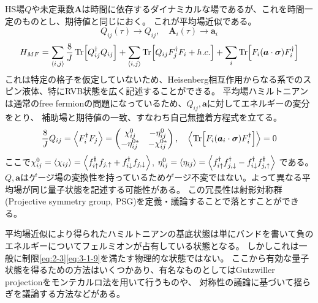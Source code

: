 \documentclass[11pt, aps, longbibliography]{article}
\begin{document}
        HS場$Q$や未定乗数$\boldsymbol{A}$は時間に依存するダイナミカルな場であるが、これを時間一定のものとし、期待値と同じにおく。
        これが平均場近似である。
        \begin{equation}\label{eq:3-1-18}
            Q_{ij}(\tau) \rightarrow Q_{ij}, \quad \boldsymbol{A}_i(\tau) \rightarrow \boldsymbol{a}_i
        \end{equation}
        \begin{equation}\label{eq:3-1-19}
            H_{MF} = \sum_{\langle i,j\rangle}\frac{8}{J}\Tr [Q_{ij}^\dagger Q_{ij}] + \sum_{\langle i,j\rangle}\Tr[Q_{ij}F_{j}^\dagger F_i + h.c.] + \sum_i \Tr[F_i (\boldsymbol{a} \cdot \boldsymbol{\sigma}) F_i^\dagger]
        \end{equation}
        これは特定の格子を仮定していないため、Heisenberg相互作用からなる系でのスピン液体、特にRVB状態を広く記述することができる。
        平均場ハミルトニアンは通常のfree fermionの問題になっているため、$Q_{ij},\boldsymbol{a}$に対してエネルギーの変分をとり、
        補助場と期待値の一致、すなわち自己無撞着方程式を立てる。
        \begin{equation}\label{eq:3-1-20}
            \frac{8}{J}Q_{ij} = \expval{F_i^\dagger F_j} = \begin{pmatrix}
                \chi_{ij}^0 & -\eta_{ij}^0 \\ -\eta_{ij}^{0*} & -\chi_{ij}^{0*}
            \end{pmatrix}, \quad \expval{\Tr [F_i (\boldsymbol{a}_i \cdot \boldsymbol{\sigma}) F_i^\dagger]} = 0
        \end{equation}
        ここで$\chi_{ij}^0 = \expval{\chi_{ij}} = \expval{f_{i\uparrow}^\dagger f_{j,\uparrow} + f_{i\downarrow}^\dagger f_{j,\downarrow}}$, $\eta_{ij}^0 = \expval{\eta_{ij}} = \expval{f_{i\uparrow}^\dagger f_{j,\downarrow}^\dagger - f_{i\downarrow}^\dagger f_{j,\uparrow}^\dagger}$
        である。
        $Q,\boldsymbol{a}$はゲージ場の変換性を持っているためゲージ不変ではない。よって異なる平均場が同じ量子状態を記述する可能性がある。
        この冗長性は射影対称群(Projective symmetry group, PSG)を定義・議論することで落とすことができる。

        平均場近似により得られたハミルトニアンの基底状態は単にバンドを書いて負のエネルギーについてフェルミオンが占有している状態となる。
        しかしこれは一般に制限\eqref{eq:2-3}\eqref{eq:3-1-9}を満たす物理的な状態ではない。
        ここから有効な量子状態を得るための方法はいくつかあり、有名なものとしてはGutzwiller projectionをモンテカルロ法を用いて行うものや、
        対称性の議論に基づいて揺らぎを議論する方法などがある。
\end{document}
